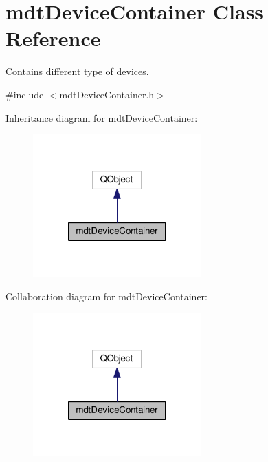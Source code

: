 \hypertarget{classmdt_device_container}{\section{mdt\-Device\-Container Class Reference}
\label{classmdt_device_container}
}


Contains different type of devices.  




{\ttfamily \#include $<$mdt\-Device\-Container.\-h$>$}



Inheritance diagram for mdt\-Device\-Container\-:
\nopagebreak
\begin{figure}[H]
\begin{center}
\leavevmode
\includegraphics[width=184pt]{classmdt_device_container__inherit__graph}
\end{center}
\end{figure}


Collaboration diagram for mdt\-Device\-Container\-:
\nopagebreak
\begin{figure}[H]
\begin{center}
\leavevmode
\includegraphics[width=184pt]{classmdt_device_container__coll__graph}
\end{center}
\end{figure}
